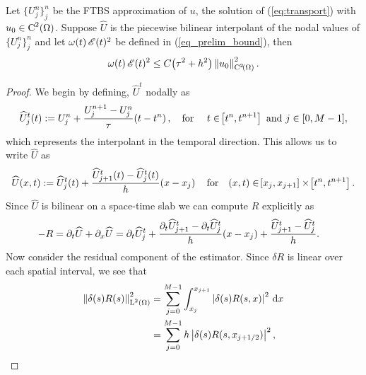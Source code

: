 \documentclass[final]{amsart}
\renewcommand{\d}{\ensuremath{\,\mathrm{d}}}
\numberwithin{equation}{section}
\begin{document}
\begin{Lem}
	\label{subsec:asymptotic_convergence_rate}
	Let $\{ U^n_j \}_{j}^{n}$ be the FTBS approximation of $u$, the
	solution of (\ref{eq:transport}) with $u_0 \in
	\operatorname C^{2}(\Omega)$. Suppose $\widehat U$ is the piecewise bilinear
	interpolant of the nodal values of $\{ U^n_j \}_{j}^{n}$ and let
	$\omega\!\left({t}\right)\mathscr E(t)^2$ be defined in (\ref{eq_prelim_bound}), then
	\begin{equation}
	\omega\!\left({t}\right)\mathscr E(t)^2 \leq C \!\left({\tau^2 + h^2}\right)\left\|u_0\right\|_{\operatorname C^{2}\!\left({\Omega}\right)}^2.
	\end{equation}
\end{Lem}
\begin{proof}
	We begin by defining, $\widehat{U}^t$ nodally as
	\begin{equation}
	\widehat{U}^t_j\!\left({t}\right)
	:=
	U^n_j +\frac{U^{n+1}_j
		-
		U^n_j}{\tau}\!\left({t-t^n}\right), \quad \text{for }\quad t \in \!\left[{t^n,
		t^{n+1}}\right]  \text{ and } j\in [0,M-1],
	\end{equation}
	which represents the interpolant in the temporal direction. This allows us
	to write $\widehat{U}$ as
	\begin{equation}
	\widehat{U}\qp{x,t}
	:=
	\widehat{U}^t_j\qp{t} + \frac{\widehat{U}_{j+1}^t\qp{t}-\widehat{U}_j^t\qp{t} }{h}\qp{x-x_j}\quad\text{for}\quad \qp{x,t}\in \qb{x_j, x_{j+1}}\times\qb{t^n, t^{n+1}}.
	\end{equation}
	Since $\widehat{U}$ is bilinear on a space-time slab we can compute
	$R$ explicitly as
	\begin{equation}
	\label{eq:Reqn}
	\begin{aligned}
	-R
	=
	\partial_t \widehat{U}
	+
	\partial_x \widehat{U}
	&=
	\partial_t \widehat{U}^t_j
	+
	\frac{\partial_t\widehat{U}_{j+1}^t-\partial_t\widehat{U}_j^t}{h}\!\left({x-x_j}\right)
	+
	\frac{\widehat{U}_{j+1}^t-\widehat{U}_j^t}{h}.
	\end{aligned}
	\end{equation}
	Now consider the residual component of the estimator. Since
	$\delta R$ is linear over each spatial interval, we see that
	\begin{equation}
	\begin{split}
	\Norm{\delta(s) R(s)}_{\leb{2}(\W)}^2
	&=
	\sum_{j=0}^{M-1}\int_{x_j}^{x_{j+1}} \norm{\delta(s) R(s,x)}^2 \d x
	\\
	&=
	\sum_{j=0}^{M-1} h \norm{\delta(s) R(s, x_{j+1/2})}^2,
	\end{split}
	\end{equation}

\end{proof}
\end{document}
